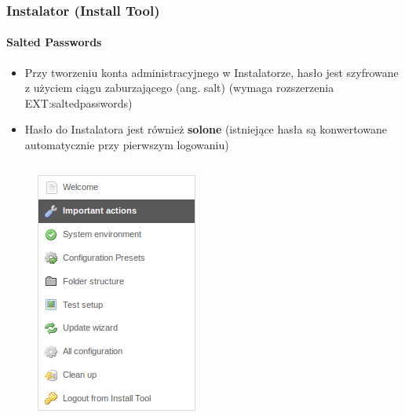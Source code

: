 \begin{frame}[fragile]
	\frametitle{Instalator (Install Tool)}
	\framesubtitle{Salted Passwords}

	\begin{itemize}
		\item Przy tworzeniu konta administracyjnego w Instalatorze,\newline
			hasło jest szyfrowane z użyciem ciągu zaburzającego (ang. salt)
			\smaller(wymaga rozszerzenia EXT:saltedpasswords)\normalsize
		\item Hasło do Instalatora jest również \textbf{solone} \newline
			\smaller(istniejące hasła są konwertowane automatycznie przy pierwszym logowaniu)\normalsize
	\end{itemize}

	\begin{columns}[T]
		\begin{column}{.3\textwidth}
			\begin{figure}\vspace*{-0.4cm}
				\includegraphics[width=0.7\linewidth]{Images/InstallTool/ImportantActions.png}
			\end{figure}
		\end{column}
		\begin{column}{.7\textwidth}

\end{column}
\end{columns}
\end{frame}
